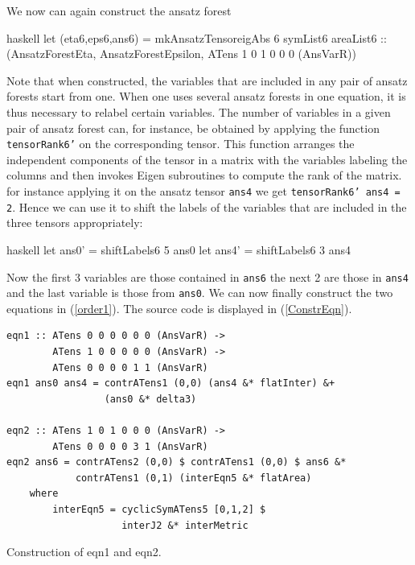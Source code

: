 \documentclass[a4paper,12pt, DIV=14, BCOR=5mm, twoside, headsepline, numbers=noenddot]{scrbook}
\begin{document}
We now can again construct the ansatz forest 

\begin{center}
\begin{cminted}{haskell}
let (eta6,eps6,ans6) = mkAnsatzTensoreigAbs 6 symList6 areaList6 :: 
                       (AnsatzForestEta, AnsatzForestEpsilon,
                       ATens 1 0 1 0 0 0 (AnsVarR))
\end{cminted}
\end{center}

Note that when constructed, the variables that are included in any pair of ansatz forests start from one. When one uses several ansatz forests in one equation, it is thus necessary to relabel certain variables. The number of variables in a given pair of ansatz forest can, for instance, be obtained by applying the function \texttt{tensorRank6'} on the corresponding tensor. This function arranges the independent components of the tensor in a matrix with the variables labeling the columns and then invokes Eigen subroutines to compute the rank of the matrix. for instance applying it on the ansatz tensor \texttt{ans4} we get \texttt{tensorRank6' ans4 = 2}. Hence we can use it to shift the labels of the variables that are included in the three tensors appropriately:

\begin{center}
\begin{cminted}{haskell}
let ans0' = shiftLabels6 5 ans0
let ans4' = shiftLabels6 3 ans4 
\end{cminted}
\end{center}

Now the first 3 variables are those contained in \texttt{ans6} the next 2 are those in \texttt{ans4} and the last variable is those from \texttt{ans0}.
We can now finally construct the two equations in (\ref{order1}). The source code is displayed in (\ref{ConstrEqn}).

\begin{listing}[hbt!]
\begin{verbatim}
eqn1 :: ATens 0 0 0 0 0 0 (AnsVarR) ->
        ATens 1 0 0 0 0 0 (AnsVarR) ->
        ATens 0 0 0 0 1 1 (AnsVarR)
eqn1 ans0 ans4 = contrATens1 (0,0) (ans4 &* flatInter) &+
                 (ans0 &* delta3)
                 
eqn2 :: ATens 1 0 1 0 0 0 (AnsVarR) ->
        ATens 0 0 0 0 3 1 (AnsVarR)
eqn2 ans6 = contrATens2 (0,0) $ contrATens1 (0,0) $ ans6 &*
            contrATens1 (0,1) (interEqn5 &* flatArea)
    where 
        interEqn5 = cyclicSymATens5 [0,1,2] $
                    interJ2 &* interMetric
\end{verbatim} 
\caption{Construction of eqn1 and eqn2.}\label{ConstrEqn}
\end{listing}
\end{document}
